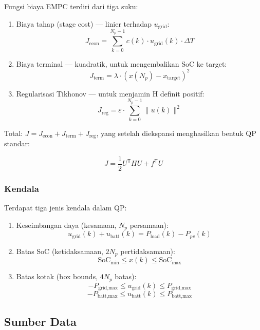 \documentclass{article}
\begin{document}
Fungsi biaya EMPC terdiri dari tiga suku:

\begin{enumerate}
    \item Biaya tahap (stage cost) — linier terhadap $u_{\text{grid}}$:
    $$J_{\text{econ}} = \sum_{k=0}^{N_p-1} c(k) \cdot u_{\text{grid}}(k) \cdot \Delta T$$
    
    \item Biaya terminal — kuadratik, untuk mengembalikan SoC ke target:
    $$J_{\text{term}} = \lambda \cdot (x(N_p) - x_{\text{target}})^2$$
    
    \item Regularisasi Tikhonov — untuk menjamin H definit positif:
    $$J_{\text{reg}} = \varepsilon \cdot \sum_{k=0}^{N_p-1} \|u(k)\|^2$$
\end{enumerate}

Total: $J = J_{\text{econ}} + J_{\text{term}} + J_{\text{reg}}$, yang setelah diekspansi menghasilkan bentuk QP standar:

\begin{equation}
J = \frac{1}{2} U^{\mathsf T} H U + f^{\mathsf T} U
\end{equation}

\subsubsection{Kendala}

Terdapat tiga jenis kendala dalam QP:

\begin{enumerate}
    \item Keseimbangan daya (kesamaan, $N_p$ persamaan):
    $$u_{\text{grid}}(k) + u_{\text{batt}}(k) = P_{\text{load}}(k) - P_{pv}(k)$$
    
    \item Batas SoC (ketidaksamaan, $2N_p$ pertidaksamaan):
    $$\text{SoC}_{\text{min}} \leq x(k) \leq \text{SoC}_{\text{max}}$$
    
    \item Batas kotak (box bounds, $4N_p$ batas):
    $$-P_{\text{grid,max}} \leq u_{\text{grid}}(k) \leq P_{\text{grid,max}}$$
    $$-P_{\text{batt,max}} \leq u_{\text{batt}}(k) \leq P_{\text{batt,max}}$$
\end{enumerate}

\subsection{Sumber Data}
\end{document}
